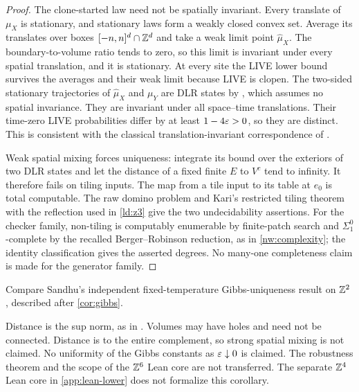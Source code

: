 \begin{proof}
The clone-started law need not be spatially invariant. Every translate of $\mu_X$ is stationary, and stationary laws form a weakly closed convex set. Average its translates over boxes $[-n,n]^d\cap\mathbb{Z}^d$ and take a weak limit point $\widehat\mu_X$. The boundary-to-volume ratio tends to zero, so this limit is invariant under every spatial translation, and it is stationary. At every site the LIVE lower bound survives the averages and their weak limit because LIVE is clopen. The two-sided stationary trajectories of $\widehat\mu_X$ and $\mu_Y$ are DLR states by \cite[Lemma~2.4]{DM26}, which assumes no spatial invariance. They are invariant under all space--time translations. Their time-zero LIVE probabilities differ by at least $1-4\varepsilon>0$, so they are distinct. This is consistent with the classical translation-invariant correspondence of \cite{GKLM89}.

Weak spatial mixing forces uniqueness: integrate its bound over the exteriors of two DLR states and let the distance of a fixed finite $E$ to $V^c$ tend to infinity. It therefore fails on tiling inputs. The map from a tile input to its table at $e_0$ is total computable. The raw domino problem \cite{Berger66,Robinson71} and Kari's restricted tiling theorem with the reflection used in \cref{ld:z3} \cite{Kari92,Kari05} give the two undecidability assertions. For the checker family, non-tiling is computably enumerable by finite-patch search and $\Sigma^0_1$-complete by the recalled Berger--Robinson reduction, as in \cref{nw:complexity}; the identity classification gives the asserted degrees. No many-one completeness claim is made for the generator family.
\end{proof}

Compare Sandhu's independent fixed-temperature Gibbs-uniqueness result on $\mathbb{Z}^2$ \cite[Theorem~1.1]{Sandhu26}, described after \cref{cor:gibbs}.

Distance is the sup norm, as in \cite[Definition~2.3]{DM26}. Volumes may have holes and need not be connected. Distance is to the entire complement, so strong spatial mixing is not claimed. No uniformity of the Gibbs constants as $\varepsilon\downarrow0$ is claimed. The robustness theorem and the scope of the $\mathbb{Z}^6$ Lean core are not transferred. The separate $\mathbb{Z}^4$ Lean core in \cref{app:lean-lower} does not formalize this corollary.

